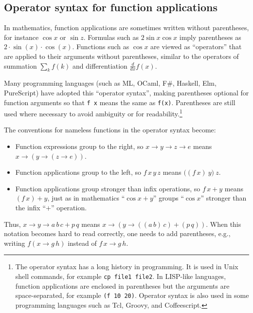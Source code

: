 \subsection{Operator syntax for function applications}

In mathematics, function applications are sometimes written without
parentheses, for instance $\cos x$ or $\sin z$. Formulas such as
$2\sin x\cos x$ imply parentheses as $2\cdot\sin\left(x\right)\cdot\cos\left(x\right)$.
Functions such as $\cos x$ are viewed as \textsf{``}operators\textsf{''} that are
applied to their arguments without parentheses, similar to the operators
of summation $\sum_{k}f(k)$ and differentiation $\frac{d}{dx}f(x)$.

Many programming languages (such as ML, OCaml, F\#, Haskell, Elm,
PureScript) have adopted this \textsf{``}operator syntax\textsf{''},
making parentheses optional for function arguments so that \lstinline!f x!
means the same as \lstinline!f(x)!. Parentheses are still used where
necessary to avoid ambiguity or for readability.\footnote{The operator syntax has a long history in programming. It is used
in Unix shell commands, for example \lstinline!cp file1 file2!. In
LISP-like languages, function applications are enclosed in parentheses
but the arguments are space-separated, for example \lstinline!(f 10 20)!.
Operator syntax is also used in some programming languages such as
Tcl, Groovy, and Coffeescript.}

The conventions for nameless functions in the operator syntax become:
\begin{itemize}
\item Function expressions group to the right, so $x\rightarrow y\rightarrow z\rightarrow e$
means $x\rightarrow\left(y\rightarrow\left(z\rightarrow e\right)\right)$.
\item Function applications group to the left, so $f\,x\,y\,z$ means $\big((f\,x)\:y\big)\:z$.
\item Function applications group stronger than infix operations, so $f\,x+y$
means $(f\,x)+y$, just as in mathematics \textsf{``}$\cos x+y$\textsf{''} groups
\textsf{``}$\cos x$\textsf{''} stronger than the infix \textsf{``}$+$\textsf{''} operation.
\end{itemize}
Thus, $x\rightarrow y\rightarrow a\,b\,c+p\,q$ means $x\rightarrow\left(y\rightarrow\left(\left(a\,b\right)\,c\right)+(p\,q)\right)$.
When this notation becomes hard to read correctly, one needs to add
parentheses, e.g., writing $f(x\rightarrow g\,h)$ instead of $f\,x\rightarrow g\,h$.

